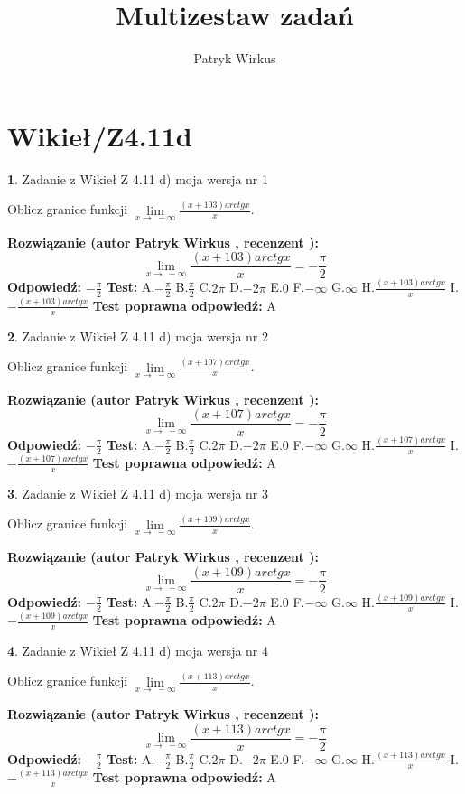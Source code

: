 \documentclass[12pt, a4paper]{article}
\title{Multizestaw zadań}
\author{Patryk Wirkus}
\date{}
\theoremstyle{definition} %
\newtheorem{zad}{}
\newcommand{\kategoria}[1]{\section{#1}}
\newcommand{\zadStart}[1]{\begin{zad}#1\newline}
\newcommand{\zadStop}{\end{zad}}
\newcommand{\rozwStart}[2]{\noindent \textbf{Rozwiązanie (autor #1 , recenzent #2): }\newline}
\newcommand{\rozwStop}{\newline}
\newcommand{\odpStart}{\noindent \textbf{Odpowiedź:}\newline}
\newcommand{\odpStop}{\newline}
\newcommand{\testStart}{\noindent \textbf{Test:}\newline}
\newcommand{\testStop}{\newline}
\newcommand{\kluczStart}{\noindent \textbf{Test poprawna odpowiedź:}\newline}
\newcommand{\kluczStop}{\newline}
\begin{document}
\maketitle

\kategoria{Wikieł/Z4.11d}


\zadStart{Zadanie z Wikieł Z 4.11 d) moja wersja nr 1}

Oblicz granice funkcji $\lim\limits_{x\to\ -\infty}\frac{(x+103)arctgx}{x}$.
\zadStop
\rozwStart{Patryk Wirkus}{}
$$\lim\limits_{x\to\ -\infty}\frac{(x+103)arctgx}{x} = -\frac{\pi}{2}$$
\rozwStop
\odpStart
$-\frac{\pi}{2}$
\odpStop
\testStart
A.$-\frac{\pi}{2}$ B.$\frac{\pi}{2}$ C.$2\pi$ D.$-2\pi$ E.$0$ F.$-\infty$ G.$\infty$ H.$\frac{(x+103)arctgx}{x}$ I.$-\frac{(x+103)arctgx}{x}$
\testStop
\kluczStart
A
\kluczStop



\zadStart{Zadanie z Wikieł Z 4.11 d) moja wersja nr 2}

Oblicz granice funkcji $\lim\limits_{x\to\ -\infty}\frac{(x+107)arctgx}{x}$.
\zadStop
\rozwStart{Patryk Wirkus}{}
$$\lim\limits_{x\to\ -\infty}\frac{(x+107)arctgx}{x} = -\frac{\pi}{2}$$
\rozwStop
\odpStart
$-\frac{\pi}{2}$
\odpStop
\testStart
A.$-\frac{\pi}{2}$ B.$\frac{\pi}{2}$ C.$2\pi$ D.$-2\pi$ E.$0$ F.$-\infty$ G.$\infty$ H.$\frac{(x+107)arctgx}{x}$ I.$-\frac{(x+107)arctgx}{x}$
\testStop
\kluczStart
A
\kluczStop



\zadStart{Zadanie z Wikieł Z 4.11 d) moja wersja nr 3}

Oblicz granice funkcji $\lim\limits_{x\to\ -\infty}\frac{(x+109)arctgx}{x}$.
\zadStop
\rozwStart{Patryk Wirkus}{}
$$\lim\limits_{x\to\ -\infty}\frac{(x+109)arctgx}{x} = -\frac{\pi}{2}$$
\rozwStop
\odpStart
$-\frac{\pi}{2}$
\odpStop
\testStart
A.$-\frac{\pi}{2}$ B.$\frac{\pi}{2}$ C.$2\pi$ D.$-2\pi$ E.$0$ F.$-\infty$ G.$\infty$ H.$\frac{(x+109)arctgx}{x}$ I.$-\frac{(x+109)arctgx}{x}$
\testStop
\kluczStart
A
\kluczStop



\zadStart{Zadanie z Wikieł Z 4.11 d) moja wersja nr 4}

Oblicz granice funkcji $\lim\limits_{x\to\ -\infty}\frac{(x+113)arctgx}{x}$.
\zadStop
\rozwStart{Patryk Wirkus}{}
$$\lim\limits_{x\to\ -\infty}\frac{(x+113)arctgx}{x} = -\frac{\pi}{2}$$
\rozwStop
\odpStart
$-\frac{\pi}{2}$
\odpStop
\testStart
A.$-\frac{\pi}{2}$ B.$\frac{\pi}{2}$ C.$2\pi$ D.$-2\pi$ E.$0$ F.$-\infty$ G.$\infty$ H.$\frac{(x+113)arctgx}{x}$ I.$-\frac{(x+113)arctgx}{x}$
\testStop
\kluczStart
A
\kluczStop
\end{document}
